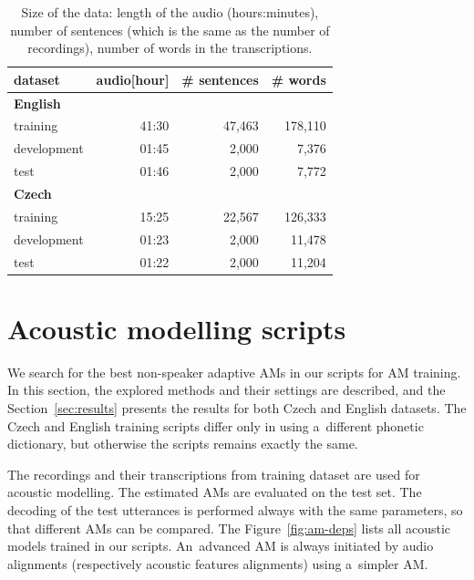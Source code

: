 \begin{table}[hbp]
    \centering
    \begin{tabular}{lrrr}
        \hline
        dataset & audio[hour] & \# sentences & \# words \\
        \hline
        \textbf{English} & & & \\
                training & 41:30 & 47,463 & 178,110 \\
                development & 01:45 & 2,000 & 7,376 \\
                test & 01:46 & 2,000 & 7,772 \\
        \hline
        \textbf{Czech} & & & \\
                training & 15:25 & 22,567 & 126,333 \\
                development & 01:23 & 2,000 & 11,478 \\
                test & 01:22 & 2,000 & 11,204 \\
        \hline
		\end{tabular}
    \caption{Size of the data: length of the audio (hours:minutes), number of sentences
        (which is the same as the number of recordings), number of words in the 
    transcriptions.\cite{korvas_2014}}
    \label{tab:audio}
\end{table}





\section{Acoustic modelling scripts}
\label{sec:am_train}

We search for the best non-speaker adaptive \acp{AM} in our scripts for \ac{AM} training. 
In this section, the explored methods and their settings are described, and the Section~\ref{sec:results} presents the results for both Czech and English datasets.
The Czech and English training scripts differ only in using a~different phonetic dictionary, but otherwise the scripts remains exactly the same.

The recordings and their transcriptions from training dataset are used for acoustic modelling.
The estimated \acp{AM} are evaluated on the test set.
The decoding of the test utterances is performed always with the same parameters, so that different \acp{AM} can be compared.
The Figure~\ref{fig:am-deps} lists all acoustic models trained in our scripts.
An~advanced \ac{AM} is always initiated by audio alignments (respectively acoustic features alignments) using a~simpler \ac{AM}.

